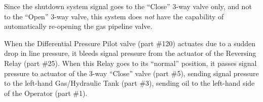 \vskip 10pt

Since the shutdown system signal goes to the ``Close'' 3-way valve only, and not to the ``Open'' 3-way valve, this system does {\it not} have the capability of automatically re-opening the gas pipeline valve.

\vskip 10pt

When the Differential Pressure Pilot valve (part \#120) actuates due to a sudden drop in line pressure, it bleeds signal pressure from the actuator of the Reversing Relay (part \#25).  When this Relay goes to its ``normal'' position, it passes signal pressure to actuator of the 3-way ``Close'' valve (part \#5), sending signal pressure to the left-hand Gas/Hydraulic Tank (part \#3), sending oil to the left-hand side of the Operator (part \#1).











